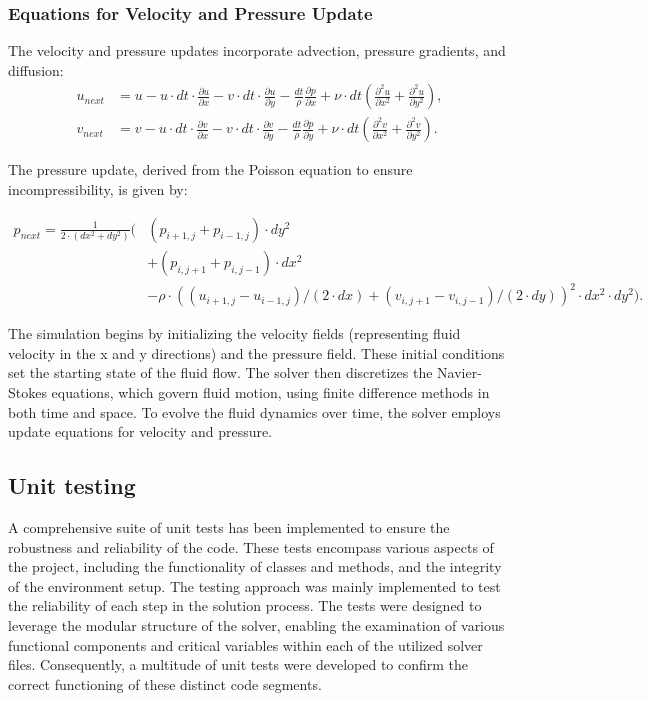 \subsubsection{Equations for Velocity and Pressure Update}
The velocity and pressure updates incorporate advection, pressure gradients, and diffusion:
\begin{align}
    u_{next} &= u - u \cdot dt \cdot \frac{\partial u}{\partial x} - v \cdot dt \cdot \frac{\partial u}{\partial y} - \frac{dt}{\rho} \frac{\partial p}{\partial x} + \nu \cdot dt \left( \frac{\partial^2 u}{\partial x^2} + \frac{\partial^2 u}{\partial y^2} \right), \\
    v_{next} &= v - u \cdot dt \cdot \frac{\partial v}{\partial x} - v \cdot dt \cdot \frac{\partial v}{\partial y} - \frac{dt}{\rho} \frac{\partial p}{\partial y} + \nu \cdot dt \left( \frac{\partial^2 v}{\partial x^2} + \frac{\partial^2 v}{\partial y^2} \right).
\end{align}

The pressure update, derived from the Poisson equation to ensure incompressibility, is given by:

\begin{equation}
\begin{split}
    p_{next} = \frac{1}{2 \cdot (dx^2 + dy^2)} \bigg(& (p_{i+1, j} + p_{i-1, j}) \cdot dy^2 \\
    & + (p_{i, j+1} + p_{i, j-1}) \cdot dx^2 \\
    & - \rho \cdot \left((u_{i+1, j} - u_{i-1, j}) / (2 \cdot dx) + (v_{i, j+1} - v_{i, j-1}) / (2 \cdot dy)\right)^2 \cdot dx^2 \cdot dy^2 \bigg).
\end{split}
\end{equation}

The simulation begins by initializing the velocity fields (representing fluid velocity in the x and y directions) and the pressure field. These initial conditions set the starting state of the fluid flow. The solver then discretizes the Navier-Stokes equations, which govern fluid motion, using finite difference methods in both time and space. To evolve the fluid dynamics over time, the solver employs update equations for velocity and pressure. 

\subsection{Unit testing}
A comprehensive suite of unit tests has been implemented to ensure the robustness and reliability of the code. These tests encompass various aspects of the project, including the functionality of classes and methods, and the integrity of the environment setup. The testing approach was mainly implemented to test the reliability of each step in the solution process. The tests were designed to leverage the modular structure of the solver, enabling the examination of various functional components and critical variables within each of the utilized solver files. Consequently, a multitude of unit tests were developed to confirm the correct functioning of these distinct code segments.
\\

